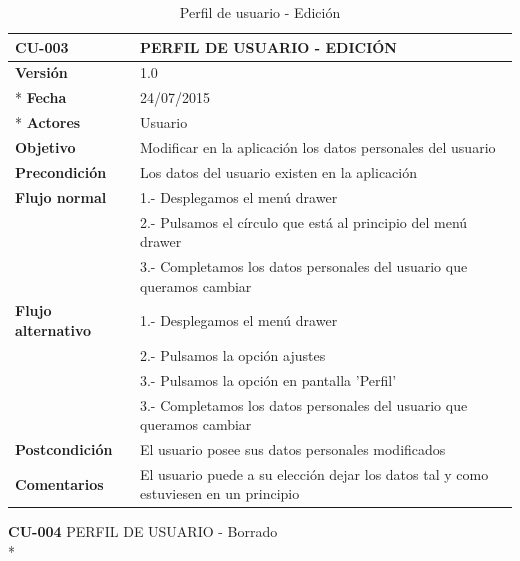 \documentclass[../pfc.tex]{subfiles}
\begin{document}
	\begin{table}[H]
		\centering
		\begin{tabular}[t]{|p{3cm}|p{9.5cm}|}
			\hline \textbf{CU-003} & \textbf{PERFIL DE USUARIO - EDICIÓN} \\*
			\hline\hline \textbf{Versión} & 1.0 \\ *
			\hline\hline \textbf{Fecha} & 24/07/2015 \\ *
			\hline\textbf{Actores} 	& Usuario\\*
			\hline \textbf{Objetivo} & Modificar en la aplicación los datos personales del usuario\\* 			
			\hline \textbf{Precondición} & Los datos del usuario existen en la aplicación \\* 
			\hline \textbf{Flujo normal} & 1.- Desplegamos el menú drawer\\* 
			& 2.- Pulsamos el círculo que está al principio del menú drawer\\*	
			& 3.- Completamos los datos personales del usuario que queramos cambiar\\*	
			\hline \textbf{Flujo alternativo} & 1.- Desplegamos el menú drawer\\* 
			& 2.- Pulsamos la opción ajustes \\*	
			& 3.- Pulsamos la opción en pantalla 'Perfil' \\*	
			& 3.- Completamos los datos personales del usuario que queramos cambiar\\*	
			\hline \textbf{Postcondición} & El usuario posee sus datos personales modificados\\* 
			\hline \textbf{Comentarios}   & El usuario puede a su elección dejar los datos tal y como estuviesen en un principio\\*
			\hline
		\end{tabular}
		\caption{Perfil de usuario - Edición}
		\label{tabla:caso003}

	\end{table}
		
	\textbf{CU-004}	PERFIL DE USUARIO - Borrado\\*
\end{document}
